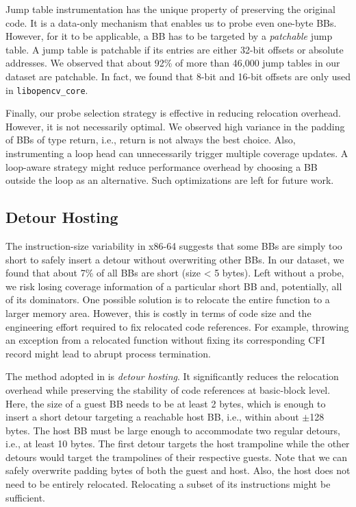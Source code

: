 {Jump table instrumentation has the unique property of preserving the original code.
It is a data-only mechanism that enables us to probe even one-byte BBs.
However, for it to be applicable, a BB has to be targeted by a \textit{patchable} jump table.
A jump table is patchable if its entries are either 32-bit offsets or absolute addresses.
We observed that about 92\% of more than 46,000 jump tables in our dataset are patchable.
In fact, we found that 8-bit and 16-bit offsets are only used in \texttt{libopencv\_core}.


Finally, our probe selection strategy is effective in reducing relocation overhead.
However, it is not necessarily optimal.
We observed high variance in the padding of BBs of type \textsf{return}, i.e., \textsf{return} is not always the best choice.
Also, instrumenting a loop head can unnecessarily trigger multiple coverage updates. A loop-aware strategy might reduce performance overhead by choosing a BB outside the loop as an alternative. Such optimizations are left for future work.

\subsection{Detour Hosting}
\label{sec:detour-hosting}

The instruction-size variability in x86-64 suggests that some BBs are simply too short to safely insert a detour without overwriting other BBs.
In our dataset, we found that about 7\% of all BBs are short (size < 5 bytes).
Left without a probe, we risk losing coverage information of a particular short BB and, potentially, all of its dominators.
One possible solution is to relocate the entire function to a larger memory area.
However, this is costly in terms of code size and the engineering effort required to fix relocated code references.
For example, throwing an exception from a relocated function without fixing its corresponding CFI record might lead to abrupt process termination.


The method adopted in {\bcov} is \textit{detour hosting}.
It significantly reduces the relocation overhead while preserving the stability of code references at basic-block level.
Here, the size of a guest BB needs to be at least 2 bytes, which is enough to insert a short detour targeting a reachable host BB, i.e., within about $\pm$128 bytes.
The host BB must be large enough to accommodate two regular detours, i.e., at least 10 bytes.
The first detour targets the host trampoline while the other detours would target the trampolines of their respective guests.
Note that we can safely overwrite padding bytes of both the guest and host.
Also, the host does not need to be entirely relocated.
Relocating a subset of its instructions might be sufficient.


}
